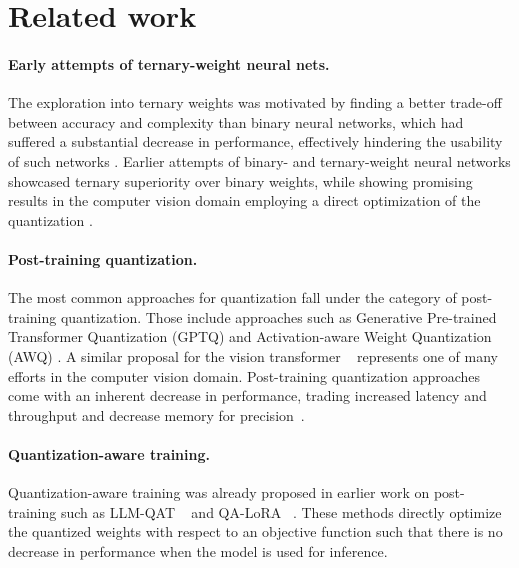 \section{Related work}
\paragraph{Early attempts of ternary-weight neural nets.}
The exploration into ternary weights was motivated by finding a better trade-off
between accuracy and complexity than binary neural networks, which had suffered
a substantial decrease in performance, effectively hindering the usability of such networks
\citep{chen2021fatnn}. 
Earlier attempts of binary- and ternary-weight neural networks showcased ternary superiority over binary weights, while showing promising results in the computer vision domain employing a direct optimization of the quantization \citep{li2016ternary, zhu2016trained}.

\paragraph{Post-training quantization.}
The most common approaches for quantization fall under the category of post-training quantization. Those include approaches such as Generative Pre-trained Transformer Quantization (GPTQ) \citep{frantar2023gptq} and Activation-aware Weight Quantization (AWQ) \citep{lin2024awq}. A similar proposal for the vision transformer ~\citep{li2023vit} represents one of many efforts in the computer vision domain. Post-training quantization approaches come with an inherent decrease in performance, trading increased latency and throughput and decrease memory for precision~\cite{kumar2025scaling}.

\paragraph{Quantization-aware training.}
Quantization-aware training was already proposed in earlier work on post-training such as LLM-QAT ~\citep{liu2023llmqat} and QA-LoRA ~\citep{xu2023qaloraquantizationawarelowrankadaptation}. These methods directly optimize the quantized weights with respect to an objective function such that there is no decrease in performance when the model is used for inference.  

